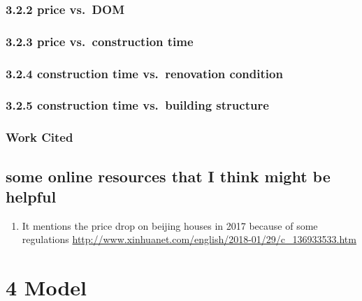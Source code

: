 \documentclass[
]{article}
\providecommand{\tightlist}{%
  \setlength{\itemsep}{0pt}\setlength{\parskip}{0pt}}
\begin{document}
\hypertarget{price-vs.-dom}{%
\subsubsection{3.2.2 price vs.~DOM}\label{price-vs.-dom}}

\hypertarget{price-vs.-construction-time}{%
\subsubsection{3.2.3 price vs.~construction
time}\label{price-vs.-construction-time}}

\hypertarget{construction-time-vs.-renovation-condition}{%
\subsubsection{3.2.4 construction time vs.~renovation
condition}\label{construction-time-vs.-renovation-condition}}

\hypertarget{construction-time-vs.-building-structure}{%
\subsubsection{3.2.5 construction time vs.~building
structure}\label{construction-time-vs.-building-structure}}

\hypertarget{work-cited}{%
\subsubsection{\texorpdfstring{\textbf{Work
Cited}}{Work Cited}}\label{work-cited}}

\hypertarget{some-online-resources-that-i-think-might-be-helpful}{%
\subsection{some online resources that I think might be
helpful}\label{some-online-resources-that-i-think-might-be-helpful}}

\begin{enumerate}
\def\labelenumi{\arabic{enumi}.}
\tightlist
\item
  It mentions the price drop on beijing houses in 2017 because of some
  regulations
  \url{http://www.xinhuanet.com/english/2018-01/29/c_136933533.htm}
\end{enumerate}

\hypertarget{model}{%
\section{4 Model}\label{model}}
\end{document}
